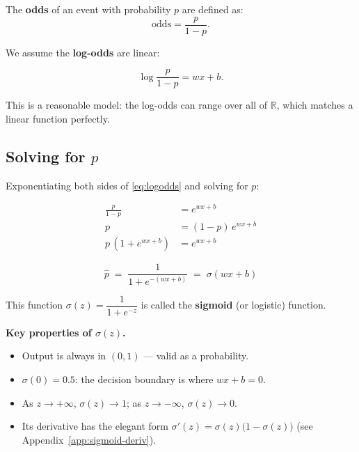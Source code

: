 \documentclass[12pt, a4paper]{article}
\newif\ifstudentmode
\newcommand{\sol}[2][6cm]{%
  \ifstudentmode
    \underline{\hspace{#1}}%
  \else
    {#2}%
  \fi
}
\theoremstyle{definition}
\newcommand{\sigmoid}{\sigma}
\begin{document}
The \textbf{odds} of an event with probability $p$ are defined as:
\[
  \text{odds} = \frac{p}{1 - p}.
\]

We assume the \textbf{log-odds} are linear:

\begin{equation}
  \log \frac{p}{1-p} = wx + b.
  \label{eq:logodds}
\end{equation}

This is a reasonable model: the log-odds can range over all of $\mathbb{R}$,
which matches a linear function perfectly.

\subsection{Solving for \texorpdfstring{$p$}{p}}

Exponentiating both sides of \eqref{eq:logodds} and solving for $p$:

\begin{align*}
  \frac{p}{1-p}     & = e^{wx+b}        \\[4pt]
  p                 & = (1-p)\,e^{wx+b} \\[4pt]
  p\,(1 + e^{wx+b}) & = e^{wx+b}
\end{align*}

\begin{resultbox}
  \[
    \hat{p} \;=\; \sol[9cm]{\frac{1}{1 + e^{-(wx+b)}} \;=\; \sigmoid(wx+b)}
  \]
\end{resultbox}

This function $\sigmoid(z) = \dfrac{1}{1+e^{-z}}$ is called the
\textbf{sigmoid} (or logistic) function.

\begin{notebox}
  \textbf{Key properties of $\sigmoid(z)$.}
  \begin{itemize}[nosep]
    \item Output is always in $(0, 1)$ — valid as a probability.
    \item $\sigmoid(0) = 0.5$: the decision boundary is where $wx + b = 0$.
    \item As $z \to +\infty$, $\sigmoid(z) \to 1$; as $z \to -\infty$,
          $\sigmoid(z) \to 0$.
    \item Its derivative has the elegant form
          $\sigmoid'(z) = \sigmoid(z)\bigl(1 - \sigmoid(z)\bigr)$
          (see Appendix~\ref{app:sigmoid-deriv}).
  \end{itemize}
\end{notebox}
\end{document}
